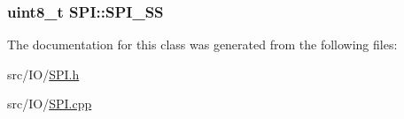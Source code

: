 \subsubsection[{\texorpdfstring{S\+P\+I\+\_\+\+SS}{SPI_SS}}]{\setlength{\rightskip}{0pt plus 5cm}uint8\+\_\+t S\+P\+I\+::\+S\+P\+I\+\_\+\+SS\hspace{0.3cm}{\ttfamily [private]}}\hypertarget{classSPI_ad4cb7d5cd46647baf68bb98a0e06e2aa}{}\label{classSPI_ad4cb7d5cd46647baf68bb98a0e06e2aa}


The documentation for this class was generated from the following files\+:\begin{DoxyCompactItemize}
\item 
src/\+I\+O/\hyperlink{SPI_8h}{S\+P\+I.\+h}\item 
src/\+I\+O/\hyperlink{SPI_8cpp}{S\+P\+I.\+cpp}\end{DoxyCompactItemize}
